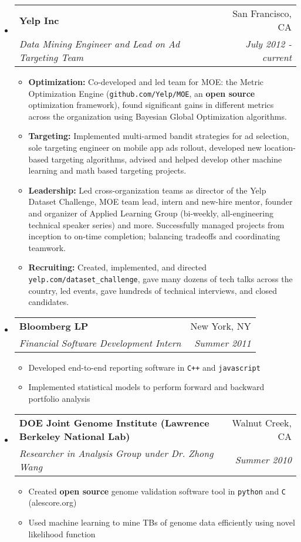 \documentclass[letterpaper,11pt]{article}
\makeatletter
\newcommand{\resitem}[1]{\item #1 \vspace{-2pt}}
\newcommand{\ressubheading}[4]{
\begin{tabular*}{6.5in}{l@{\cftdotfill{\cftsecdotsep}\extracolsep{\fill}}r}
		\textbf{#1} & #2 \\
		\textit{#3} & \textit{#4} \\
\end{tabular*}\vspace{-6pt}}
\makeatother
\begin{document}
\begin{itemize}

\item
	\ressubheading{Yelp Inc}{San Francisco, CA}{Data Mining Engineer and Lead on Ad Targeting Team}{July 2012 - current}
	\begin{itemize}
            \resitem{{\bf Optimization:} Co-developed and led team for MOE: the Metric Optimization Engine (\texttt{github.com/Yelp/MOE}, an \textbf{open source} optimization framework), found significant gains in different metrics across the organization using Bayesian Global Optimization algorithms.}
            \resitem{{\bf Targeting:} Implemented multi-armed bandit strategies for ad selection, sole targeting engineer on mobile app ads rollout, developed new location-based targeting algorithms, advised and helped develop other machine learning and math based targeting projects.}
            \resitem{{\bf Leadership:} Led cross-organization teams as director of the Yelp Dataset Challenge, MOE team lead, intern and new-hire mentor, founder and organizer of Applied Learning Group (bi-weekly, all-engineering technical speaker series) and more. Successfully managed projects from inception to on-time completion; balancing tradeoffs and coordinating teamwork.}
            \resitem{{\bf Recruiting:} Created, implemented, and directed \texttt{yelp.com/dataset\_challenge}, gave many dozens of tech talks across the country, led events, gave hundreds of technical interviews, and closed candidates.}
	\end{itemize}

\item
	\ressubheading{Bloomberg LP}{New York, NY}{Financial Software Development Intern}{Summer 2011}
	\begin{itemize}
		\resitem{Developed end-to-end reporting software in \texttt{C++} and \texttt{javascript}}
    \resitem{Implemented statistical models to perform forward and backward portfolio analysis}
	\end{itemize}

\item
	\ressubheading{DOE Joint Genome Institute (Lawrence Berkeley National Lab)}{Walnut Creek, CA}{Researcher in Analysis Group under Dr. Zhong Wang}{Summer 2010}
	\begin{itemize}
		\resitem{Created \textbf{open source} genome validation software tool in \texttt{python} and \texttt{C} (alescore.org)}
    \resitem{Used machine learning to mine TBs of genome data efficiently using novel likelihood function}
	\end{itemize}


\end{itemize}
\end{document}
